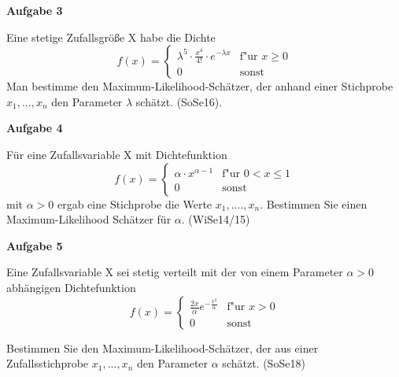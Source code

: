 \documentclass[a4paper,12pt]{article}
\newcommand{\Aufgabe}[1]{
  {
  \vspace*{0.5cm}
  \textsf{\textbf{Aufgabe #1}}
  \vspace*{0.2cm}
  
  }
}
\begin{document}
\Aufgabe{3}
Eine stetige Zufallsgröße X habe die Dichte
\begin{equation}
  f(x) = \begin{cases}
   \lambda^5 \cdot \frac{x^4}{4!} \cdot e^{-\lambda x}& \text{f"ur } x \geq 0 \\
    0 & \text{sonst }  
   \end{cases}
\end{equation}
Man bestimme den Maximum-Likelihood-Schätzer, der anhand einer Stichprobe $x_1, ...,x_n$ den Parameter $\lambda$ schätzt. (SoSe16).



\Aufgabe{4}
Für eine Zufallsvariable X mit Dichtefunktion
\begin{equation}
  f(x) = \begin{cases}
    \alpha \cdot x^{\alpha - 1} & \text{f"ur }0 < x \leq 1 \\
    0 & \text{sonst }  
   \end{cases}
\end{equation}
mit $\alpha > 0$ ergab eine Stichprobe die Werte $x_1, ...., x_n$. Bestimmen Sie einen Maximum-Likelihood Schätzer für $\alpha$. (WiSe14/15)

\Aufgabe{5}
Eine Zufallsvariable X sei stetig verteilt mit der von einem Parameter $\alpha > 0$ abhängigen Dichtefunktion
\begin{equation}
  f(x) = \begin{cases}
    \frac{2x}{\alpha}e^{-\frac{x^2}{\alpha} }& \text{f"ur } x > 0 \\
    0 & \text{sonst }  
   \end{cases}
\end{equation}

Bestimmen Sie den Maximum-Likelihood-Schätzer, der aus einer Zufallsstichprobe $x_1, ...,x_n$ den Parameter $\alpha$ schätzt. (SoSe18)

\end{document}
